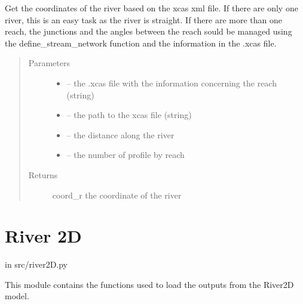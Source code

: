 \documentclass[letterpaper,10pt,english]{sphinxmanual}
\begin{document}
\begin{fulllineitems}
\label{\detokenize{index:src.mascaret.river_coord_non_georef_from_xcas}}
Get the coordinates of the river based on the xcas xml file. If there are only one river, this is an easy task as
the river is straight. If there are more than one reach, the junctions and the angles between the reach sould be
managed using the define\_stream\_network function and the information in the .xcas file.
\begin{quote}\begin{description}
\item[{Parameters}] \leavevmode\begin{itemize}
\item {} 
 -- the .xcas file with the information concerning the reach (string)

\item {} 
 -- the path to the xcas file (string)

\item {} 
 -- the distance along the river

\item {} 
 -- the number of profile by reach

\end{itemize}

\item[{Returns}] \leavevmode
coord\_r the coordinate of the river

\end{description}\end{quote}

\end{fulllineitems}



\section{River 2D}
\label{\detokenize{index:river-2d}}
in src/river2D.py

This module contains the functions used to load the outputs from the River2D model.
\label{\detokenize{index:module-src.river2d}}
\end{document}
